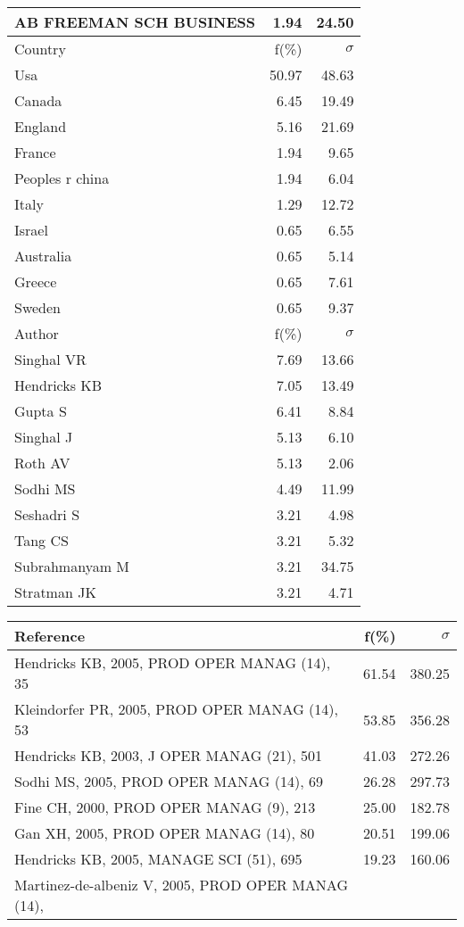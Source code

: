 \documentclass[a4paper,11pt]{report}
\begin{document}
\begin{landscape}
\begin{table}[!ht]
{\begin{tabular}{|l r r|}
AB FREEMAN SCH BUSINESS & 1.94 & 24.50\\
\hline
\hline
Country & f(\%) & $\sigma$\\
\hline
Usa & 50.97 & 48.63\\
Canada & 6.45 & 19.49\\
England & 5.16 & 21.69\\
France & 1.94 & 9.65\\
Peoples r china & 1.94 & 6.04\\
Italy & 1.29 & 12.72\\
Israel & 0.65 & 6.55\\
Australia & 0.65 & 5.14\\
Greece & 0.65 & 7.61\\
Sweden & 0.65 & 9.37\\
\hline
\hline
Author & f(\%) & $\sigma$\\
\hline
Singhal VR & 7.69 & 13.66\\
Hendricks KB & 7.05 & 13.49\\
Gupta S & 6.41 & 8.84\\
Singhal J & 5.13 & 6.10\\
Roth AV & 5.13 & 2.06\\
Sodhi MS & 4.49 & 11.99\\
Seshadri S & 3.21 & 4.98\\
Tang CS & 3.21 & 5.32\\
Subrahmanyam M & 3.21 & 34.75\\
Stratman JK & 3.21 & 4.71\\
\hline
\end{tabular}
}
{\scriptsize\begin{tabular}{|l r r|}
\hline
Reference & f(\%) & $\sigma$\\
\hline
Hendricks KB, 2005, PROD OPER MANAG (14), 35 & 61.54 & 380.25\\
Kleindorfer PR, 2005, PROD OPER MANAG (14), 53 & 53.85 & 356.28\\
Hendricks KB, 2003, J OPER MANAG (21), 501 & 41.03 & 272.26\\
Sodhi MS, 2005, PROD OPER MANAG (14), 69 & 26.28 & 297.73\\
Fine CH, 2000, PROD OPER MANAG (9), 213 & 25.00 & 182.78\\
Gan XH, 2005, PROD OPER MANAG (14), 80 & 20.51 & 199.06\\
Hendricks KB, 2005, MANAGE SCI (51), 695 & 19.23 & 160.06\\
Martinez-de-albeniz V, 2005, PROD OPER MANAG (14), &  & \\

\end{tabular}}
\end{table}
\end{landscape}
\end{document}
